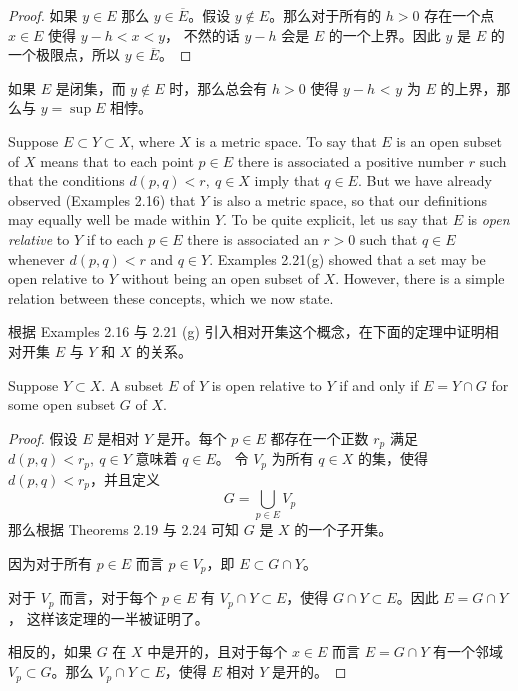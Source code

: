 \documentclass[../poma-notes.tex]{subfiles}
\begin{document}
\begin{proof}
  如果 $y \in E$ 那么 $y \in \overline{E}$。假设 $y \notin E$。那么对于所有的 $h>0$ 存在一个点 $x \in E$ 使得 $y-h<x<y$，
  不然的话 $y-h$ 会是 $E$ 的一个上界。因此 $y$ 是 $E$ 的一个极限点，所以 $y \in \overline{E}$。
\end{proof}

\begin{anote}
  如果 $E$ 是闭集，而 $y \notin E$ 时，那么总会有 $h>0$ 使得 $y-h$ < $y$ 为 $E$ 的上界，那么与 $y = \sup E$ 相悖。
\end{anote}


\begin{remark}
  Suppose $E \subset Y \subset X$, where $X$ is a metric space. To say that $E$ is an open subset of $X$ means that to
  each point $p \in E$ there is associated a positive number $r$ such that the conditions $d(p,q)<r,\ q \in X$ imply
  that $q \in E$. But we have already observed (Examples 2.16) that $Y$ is also a metric space, so that our definitions
  may equally well be made within $Y$. To be quite explicit, let us say that $E$ is \textit{open relative} to $Y$ if to
  each $p \in E$ there is associated an $r>0$ such that $q \in E$ whenever $d(p,q)<r$ and $q \in Y$. Examples 2.21(g)
  showed that a set may be open relative to $Y$ without being an open subset of $X$. However, there is a simple relation
  between these concepts, which we now state.
\end{remark}

\begin{anote}
  根据 Examples 2.16 与 2.21 (g) 引入相对开集这个概念，在下面的定理中证明相对开集 $E$ 与 $Y$ 和 $X$ 的关系。
\end{anote}

\begin{theorem}
  Suppose $Y \subset X$. A subset $E$ of $Y$ is open relative to $Y$ if and only if $E = Y \cap G$ for some open
  subset $G$ of $X$.
\end{theorem}

\begin{proof}
  假设 $E$ 是相对 $Y$ 是开。每个 $p \in E$ 都存在一个正数 $r_p$ 满足 $d(p,q)<r_p,\ q \in Y$ 意味着 $q \in E$。
  令 $V_p$ 为所有 $q \in X$ 的集，使得 $d(p,q)<r_p$，并且定义
  \[G = \bigcup\limits_{p \in E} V_p\]
  那么根据 Theorems 2.19 与 2.24 可知 $G$ 是 $X$ 的一个子开集。

  因为对于所有 $p \in E$ 而言 $p \in V_p$，即 $E \subset G \cap Y$。

  对于 $V_p$ 而言，对于每个 $p \in E$ 有 $V_p \cap Y \subset E$，使得 $G \cap Y \subset E$。因此 $E = G \cap Y$，
  这样该定理的一半被证明了。

  相反的，如果 $G$ 在 $X$ 中是开的，且对于每个 $x \in E$ 而言 $E = G \cap Y$ 有一个邻域 $V_p \subset G$。那么
  $V_p \cap Y \subset E$，使得 $E$ 相对 $Y$ 是开的。
\end{proof}
\end{document}
